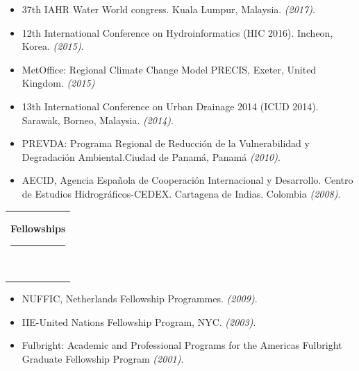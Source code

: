 \documentclass[10pt,letterpaper,english]{article}
\newcommand{\mpwidth}{\linewidth-\fboxsep-\fboxsep}
\newcommand{\cvtext}[1] {
	\begin{tabular*}{1\mpwidth}{p{0.98\mpwidth}}
		\parbox{1\mpwidth}{#1}
	\end{tabular*}
}
\newcommand{\cvsection}[1] {
	\vspace{14pt}
	\cvtext{
		\textbf{\LARGE{\textcolor{darkcol}{#1}}}\\[-4pt]
		\textcolor{accentcol}{ \rule{0.2\textwidth}{1.5pt} } \\
	}
}
\begin{document}
\begin{paracol}{2}
\begin{rightcolumn}
\begin{itemize}[leftmargin=*]
\item 37th IAHR Water World congress. Kuala Lumpur, Malaysia. \textit{(2017)}.

\item 12th International Conference on Hydroinformatics (HIC 2016). Incheon, Korea. \textit{(2015)}.

\item MetOffice: Regional Climate Change Model PRECIS, Exeter, United Kingdom. \textit{(2015)}

\item 13th International Conference on Urban Drainage 2014 (ICUD 2014). Sarawak, Borneo, Malaysia. \textit{(2014)}.

\item PREVDA: Programa Regional de Reducción de la Vulnerabilidad y Degradación Ambiental.Ciudad de Panamá, Panamá \textit{(2010)}.

\item AECID, Agencia Española de Cooperación Internacional y Desarrollo. Centro de Estudios Hidrográficos-CEDEX. Cartagena de Indias. Colombia \textit{(2008)}.

\end{itemize}



\vspace{10pt}
\cvsection{Fellowships}
\vspace{2pt}

\begin{itemize}[leftmargin=*]

\item NUFFIC, Netherlands Fellowship Programmes. \textit{(2009)}.

\item IIE-United Nations Fellowship Program, NYC. \textit{(2003)}.

\item Fulbright: Academic and Professional Programs for the Americas Fulbright Graduate Fellowship Program \textit{(2001)}.

\end{itemize}



\end{rightcolumn}
\end{paracol}
\end{document}
